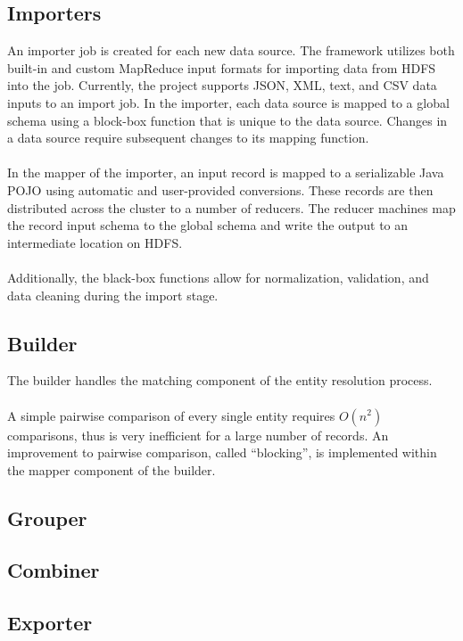 \documentclass[12pt]{article}
\begin{document}
\subsection{Importers}
An importer job is created for each new data source. The framework utilizes both built-in and custom MapReduce input formats for importing data from HDFS into the job. Currently, the project supports JSON, XML, text, and CSV data inputs to an import job. In the importer, each data source is mapped to a global schema using a block-box function that is unique to the data source. Changes in a data source require subsequent changes to its mapping function.\\\\
In the mapper of the importer, an input record is mapped to a serializable Java POJO using automatic and user-provided conversions. These records are then distributed across the cluster to a number of reducers. The reducer machines map the record input schema to the global schema and write the output to an intermediate location on HDFS.\\\\
Additionally, the black-box functions allow for normalization, validation, and data cleaning during the import stage.
\subsection{Builder}
The builder handles the matching component of the entity resolution process.\\\\
A simple pairwise comparison of every single entity requires $O(n^2)$ comparisons, thus is very inefficient for a large number of records. An improvement to pairwise comparison, called ``blocking'', is implemented within the mapper component of the builder.
\subsection{Grouper}
\subsection{Combiner}
\subsection{Exporter}


\end{document}
